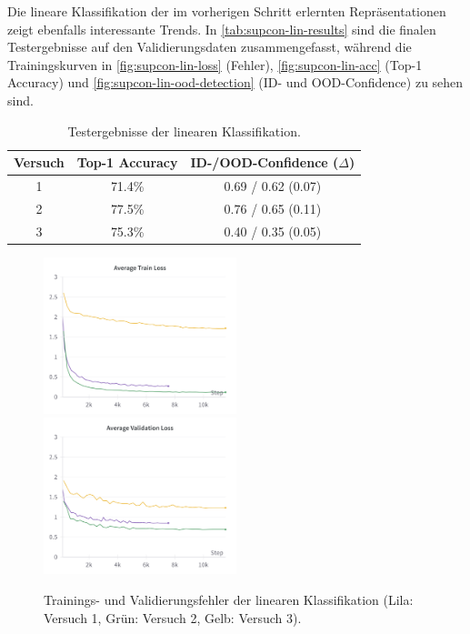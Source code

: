 Die lineare Klassifikation der im vorherigen Schritt erlernten Repräsentationen zeigt ebenfalls interessante Trends. In \autoref{tab:supcon-lin-results} sind die finalen Testergebnisse auf den Validierungsdaten zusammengefasst, während die Trainingskurven in \autoref{fig:supcon-lin-loss} (Fehler), \autoref{fig:supcon-lin-acc} (Top-1 Accuracy) und \autoref{fig:supcon-lin-ood-detection} (ID- und OOD-Confidence) zu sehen sind.

\begin{table}[h]
	\caption{Testergebnisse der linearen Klassifikation.}
	\begin{tabular}{|c|c|c|}
		\hline
		\textbf{Versuch} & \textbf{Top-1 Accuracy} & \textbf{ID-/OOD-Confidence ($\Delta$)} \\
		\hline
		1 & 71.4\% & 0.69 / 0.62 (0.07) \\
		2 & 77.5\% & 0.76 / 0.65 (0.11) \\
		3 & 75.3\% & 0.40 / 0.35 (0.05) \\
		\hline
	\end{tabular}
	\label{tab:supcon-lin-results}
\end{table}

\newpage

\begin{figure}[h]
	\centering
	\includegraphics[width=0.5\textwidth]{figure_results_supcon-lin_avg-train-loss.png}%
	\includegraphics[width=0.5\textwidth]{figure_results_supcon-lin_avg-val-loss.png}
	\caption[Trainings- und Validierungsfehler der linearen Klassifikation.]{Trainings- und Validierungsfehler der linearen Klassifikation (\textcolor{exp1}{Lila}: Versuch 1, \textcolor{exp2}{Grün}: Versuch 2, \textcolor{exp3}{Gelb}: Versuch 3).}
	\label{fig:supcon-lin-loss}
\end{figure}

